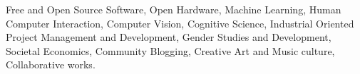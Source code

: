 \begin{cventries}

  \cventry
    {}{}{}{}
    {
      \begin{cvitems}
      \item {Free and Open Source Software, Open Hardware, Machine Learning, Human Computer Interaction, Computer Vision, Cognitive Science, Industrial Oriented Project Management and Development, Gender Studies and Development, Societal Economics, Community Blogging, Creative Art and Music culture, Collaborative works.}
      \end{cvitems}
    }
\end{cventries}